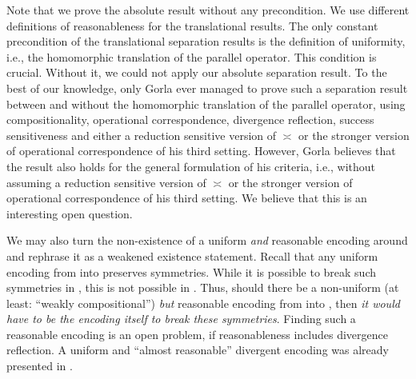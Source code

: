 \documentclass[11pt,techReport]{eptcs}
\begin{document}
Note that we prove the absolute result without any precondition.  We use different definitions of reasonableness for the translational results. The only constant precondition of the translational separation results is the definition of uniformity, i.e., the homomorphic translation of the parallel operator. This condition is crucial. Without it, we could not apply our absolute separation result. To the best of our knowledge, only Gorla ever managed to prove such a separation result between \pimix and \pisep without the homomorphic translation of the parallel operator, using compositionality, operational correspondence, divergence reflection, success sensitiveness and either a reduction sensitive version of $ \asymp $ or the stronger version of operational correspondence of his third setting.  However, Gorla believes that the result also holds for the general formulation of his criteria, i.e., without assuming a reduction sensitive version of $ \asymp $ or the stronger version of operational correspondence of his third setting. We believe that this is an interesting open question.







We may also turn the non-existence of a uniform \emph{and} reasonable encoding around and rephrase it as a weakened existence statement.  Recall that any uniform encoding from \pimix into \pisep preserves symmetries.  While it is possible to break such symmetries in \pimix, this is not possible in \pisep.  Thus, should there be a non-uniform (at least: ``weakly compositional'') \emph{but} reasonable encoding from \pimix into \pisep, then \emph{it would have to be the encoding itself to break these symmetries}.  Finding such a reasonable encoding is an open problem, if reasonableness includes divergence reflection.  A uniform and ``almost reasonable'' divergent encoding was already presented in \cite{nestmann00}.




\end{document}
